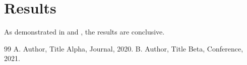 \documentclass{article}
\begin{document}
\section{Results}
As demonstrated in \cite{alpha} and \cite{beta}, the results are conclusive.

\begin{thebibliography}{99}
 A. Author, Title Alpha, Journal, 2020.
 B. Author, Title Beta, Conference, 2021.
\end{thebibliography}
\end{document}
